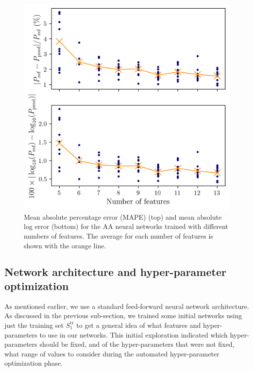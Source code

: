 \documentclass[%
 preprint,
 superscriptaddress,
 amsmath,amssymb,
longbibliography,
]{revtex4-2}
\begin{document}
\begin{figure}
    \centering
    \includegraphics{../figs/features_err.png}
    \caption{Mean absolute percentage error (MAPE) (top) and mean absolute log error (bottom) for the AA neural networks trained with different numbers of features. The average for each number of features is shown with the orange line.}
    \label{fig:feature_errors}
\end{figure}

\subsection{Network architecture and hyper-parameter optimization}\label{sec:nn_architecture}

As mentioned earlier, we use a standard feed-forward neural network architecture. As discussed in the previous sub-section, we trained some initial networks using just the training set $S_1^\textrm{tr}$ to get a general idea of what features and hyper-parameters to use in our networks. This initial exploration indicated which hyper-parameters should be fixed, and of the hyper-parameters that were not fixed, what range of values to consider during the automated hyper-parameter optimization phase.
\end{document}
